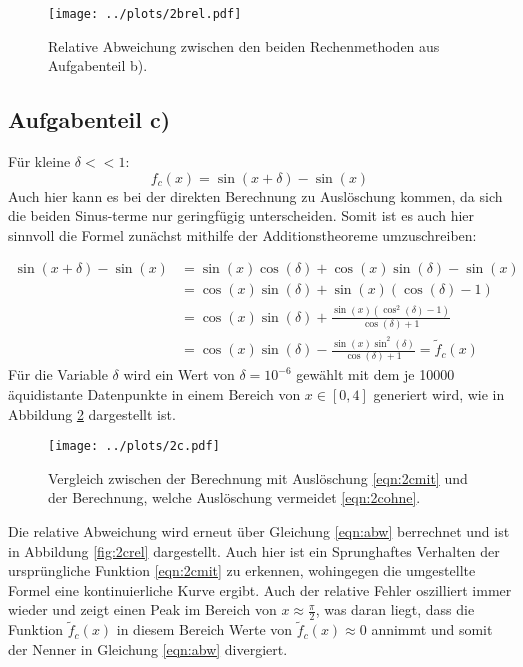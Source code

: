 \begin{figure}[H]
  \centering
  \texttt{[image: ../plots/2brel.pdf]}
  \caption{Relative Abweichung zwischen den beiden Rechenmethoden aus Aufgabenteil b).}
  \label{fig:2brel}
\end{figure}

\subsection*{Aufgabenteil c)}
Für kleine $\delta<<1$:
\begin{equation}
  f_c(x)=\sin(x+\delta)-\sin(x)
  \label{eqn:2cmit}
\end{equation}
Auch hier kann es bei der direkten Berechnung zu Auslöschung kommen, da sich die beiden Sinus-terme nur geringfügig unterscheiden.
Somit ist es auch hier sinnvoll die Formel zunächst mithilfe der Additionstheoreme umzuschreiben:

\begin{align}
  \sin(x+\delta)-\sin(x) &=\sin(x)\cos(\delta)+\cos(x)\sin(\delta)-\sin(x) \\
  &= \cos(x)\sin(\delta) +\sin(x)(\cos(\delta)-1) \\
  &= \cos(x)\sin(\delta) + \frac{\sin(x)(\cos^2(\delta)-1)}{\cos(\delta)+1} \\
  &= \cos(x)\sin(\delta) - \frac{\sin(x)\sin^2(\delta)}{\cos(\delta)+1}=\tilde{f}_c(x)
  \label{eqn:2cohne}
\end{align}
Für die Variable $\delta$ wird ein Wert von $\delta=10^{-6}$ gewählt mit dem je 10000 äquidistante
Datenpunkte in einem Bereich von $x\in[0,4]$ generiert wird, wie in Abbildung \ref{fig:2c} dargestellt ist.

\begin{figure}[H]
  \centering
  \texttt{[image: ../plots/2c.pdf]}
  \caption{Vergleich zwischen der Berechnung mit Auslöschung \eqref{eqn:2cmit} und der Berechnung, welche Auslöschung vermeidet \eqref{eqn:2cohne}.}
  \label{fig:2c}
\end{figure}

Die relative Abweichung wird erneut über Gleichung \eqref{eqn:abw} berrechnet und ist in Abbildung \ref{fig:2crel} dargestellt. Auch hier ist ein Sprunghaftes Verhalten der ursprüngliche Funktion \eqref{eqn:2cmit} zu erkennen, wohingegen die umgestellte Formel eine kontinuierliche Kurve ergibt.
Auch der relative Fehler oszilliert immer wieder und zeigt einen Peak im Bereich von $x\approx\frac{\pi}{2}$, was daran liegt, dass die Funktion $\tilde{f}_c(x)$ in diesem Bereich Werte von $\tilde{f}_c(x)\approx 0$ annimmt und somit der Nenner in Gleichung \eqref{eqn:abw} divergiert.

